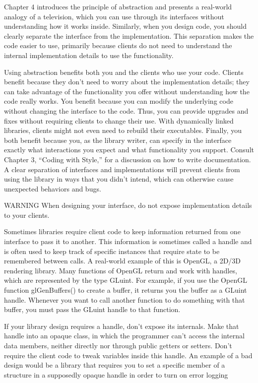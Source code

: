 Chapter 4 introduces the principle of abstraction and presents a real-world analogy of a television, which you can use through its interfaces without understanding how it works inside. Similarly, when you design code, you should clearly separate the interface from the implementation. This separation makes the code easier to use, primarily because clients do not need to understand the internal implementation details to use the functionality.

Using abstraction benefits both you and the clients who use your code. Clients benefit because they don’t need to worry about the implementation details; they can take advantage of the functionality you offer without understanding how the code really works. You benefit because you can modify the underlying code without changing the interface to the code. Thus, you can provide upgrades and fixes without requiring clients to change their use. With dynamically linked libraries, clients might not even need to rebuild their executables. Finally, you both benefit because you, as the library writer, can specify in the interface exactly what interactions you expect and what functionality you support. Consult Chapter 3, “Coding with Style,” for a discussion on how to write documentation. A clear separation of interfaces and implementations will prevent clients from using the library in ways that you didn’t intend, which can otherwise cause unexpected behaviors and bugs.

\begin{myWarning}{WARNING}
When designing your interface, do not expose implementation details to your clients.
\end{myWarning}

Sometimes libraries require client code to keep information returned from one interface to pass it to another. This information is sometimes called a handle and is often used to keep track of specific instances that require state to be remembered between calls. A real-world example of this is OpenGL, a 2D/3D rendering library. Many functions of OpenGL return and work with handles, which are represented by the type GLuint. For example, if you use the OpenGL function glGenBuffers() to create a buffer, it returns you the buffer as a GLuint handle. Whenever you want to call another function to do something with that buffer, you must pass the GLuint handle to that function.

If your library design requires a handle, don’t expose its internals. Make that handle into an opaque class, in which the programmer can’t access the internal data members, neither directly nor through public getters or setters. Don’t require the client code to tweak variables inside this handle. An example of a bad design would be a library that requires you to set a specific member of a structure in a supposedly opaque handle in order to turn on error logging


